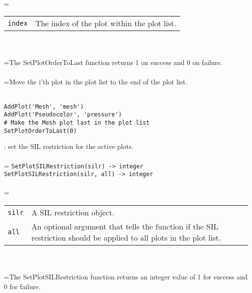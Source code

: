 \documentclass[10pt,a4paper]{report}
\begin{document}
 \\ 
\hangindent=\parindent 
\begin{tabular}{lp{9cm}}
\verb!index! & The index of the plot within the plot list. \\
\end{tabular} \\[-2mm]


 \\ 
\hangindent=\parindent The SetPlotOrderToLast function returns 1 on success and 0 on failure. \\[-3mm] 

 \\ 
\hangindent=\parindent Move the i'th plot in the plot list to the end of the plot list. \\[-3mm] 

\\[-6mm]
\begin{verbatim}AddPlot('Mesh', 'mesh')
AddPlot('Pseudocolor', 'pressure')
# Make the Mesh plot last in the plot list
SetPlotOrderToLast(0)
\end{verbatim}
\newpage


{}
: set the SIL restriction for the active plots.\\[-3mm]

 \\ 
\hangindent=\parindent 
\verb!SetPlotSILRestriction(silr) -> integer!\\ 
\verb!SetPlotSILRestriction(silr, all) -> integer!\\ [-3mm]

 \\ 
\hangindent=\parindent 
\begin{tabular}{lp{9cm}}
\verb!silr! & A SIL restriction object. \\
\verb!all! & An optional argument that tells the function if the SIL restriction should be applied to all plots in the plot list. \\
\end{tabular} \\[-2mm]


 \\ 
\hangindent=\parindent The SetPlotSILRestriction function returns an integer value of 1 for success and 0 for failure. \\[-3mm] 
\end{document}
